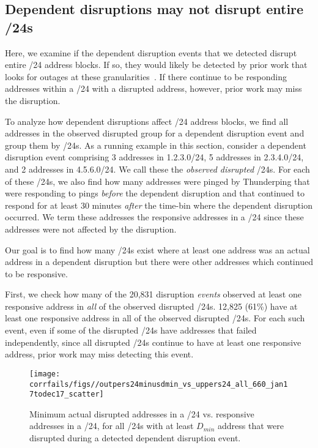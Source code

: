 
\subsection{Dependent disruptions may not disrupt entire  /24s}

Here, we examine if the dependent disruption events that we detected
disrupt entire /24 address blocks. If so, they would likely be
detected by prior work that looks for outages at these
granularities~\cite{trinocular,advancing-outage-art}. If there
continue to be responding addresses within a /24 with a disrupted
address, however, prior work may miss the disruption.

To analyze how dependent disruptions affect /24 address blocks, we find all addresses in
the observed disrupted group for a dependent disruption event and
group them by /24s. As a running example in this section, 
consider a dependent disruption event comprising 3 addresses in 1.2.3.0/24,
5 addresses in 2.3.4.0/24, and 2 addresses in 4.5.6.0/24. We call these
the \emph{observed
disrupted} /24s. For each of these /24s, we also find how many
addresses were pinged by Thunderping that were responding to pings
\emph{before} the dependent disruption and that continued to respond for at
least 30 minutes \emph{after} the time-bin where the dependent
disruption occurred. We term these addresses the responsive addresses
in a /24 since these addresses were not affected by the
disruption. 

Our goal is to find how many /24s exist where at least one address was
an actual address in a dependent disruption but there were other
addresses which continued to be responsive. 

First, we check how many of the 20,831 disruption
\emph{events} observed at least one responsive address in \emph{all} of the observed
disrupted /24s. 12,825 (61\%) have at least one
responsive address in all of the observed disrupted /24s. For each such event, even if
some of the disrupted /24s have addresses that failed independently,
since all disrupted /24s continue to have at least one responsive address,
prior work may miss detecting this event.

\begin{figure}[t]
\centering
\texttt{[image: corrfails/figs//outpers24minusdmin\_vs\_uppers24\_all\_660\_jan17todec17\_scatter]}
\caption{
\label{fig:outpers24minusdmin_vs_uppers24_all}
Minimum actual disrupted addresses in a /24 vs. responsive addresses in a /24, for all /24s with
at least $D_{min}$ address that were disrupted during a detected dependent
disruption event.}
\end{figure}


